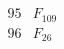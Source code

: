 \documentclass{article}
\begin{document}
{$$\begin{array}{|r|*{7}{r|}}
 & 
 & 
 & 
 & 
\\
\hline
95 
 & F_{109} &
 & 
 & 
 & 
 & 
 & 
\\
\hline
96 
 & F_{26} &
 & 
 & 
 & 
 & 
 & 

\end{array}$$}
\end{document}
